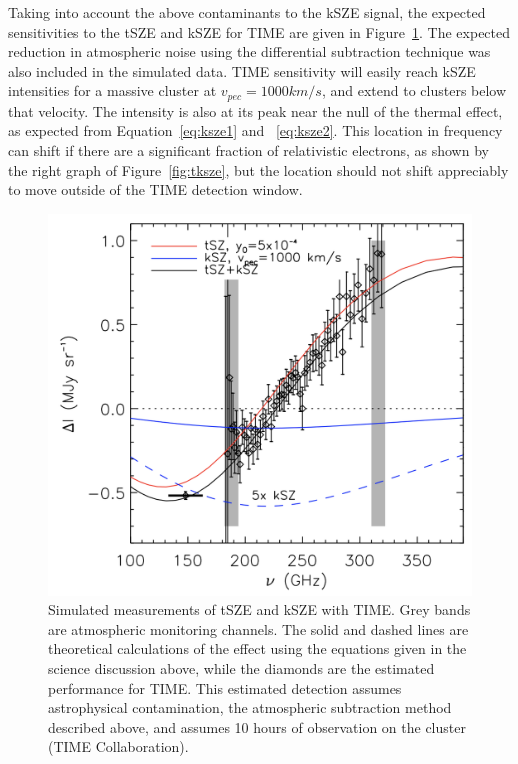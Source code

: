 \documentclass[manuscript]{aastex}
\begin{document}
Taking into account the above contaminants to the kSZE signal, the expected sensitivities to the tSZE and kSZE for TIME are given in Figure~\ref{fig:time1}. The expected reduction in atmospheric noise using the differential subtraction technique was also included in the simulated data. TIME sensitivity will easily reach kSZE intensities for a massive cluster at $v_{pec} = 1000 km/s$, and extend to clusters below that velocity. The intensity is also at its peak near the null of the thermal effect, as expected from Equation~\ref{eq:ksze1} and ~\ref{eq:ksze2}. This location in frequency can shift if there are a significant fraction of relativistic electrons, as shown by the right graph of Figure~\ref{fig:tksze}, but the location should not shift appreciably to move outside of the TIME detection window.
\begin{figure}[H]
\centering
\captionsetup{width=\textwidth}
\includegraphics[width=\textwidth]{time1.png}
\caption[Expected TIME kSZE \& tSZE Measurements -(TIME Collaboration)]{Simulated measurements of tSZE and kSZE with TIME. Grey bands are atmospheric monitoring channels. The solid and dashed lines are theoretical calculations of the effect using the equations given in the science discussion above, while the diamonds are the estimated performance for TIME. This estimated detection assumes astrophysical contamination, the atmospheric subtraction method described above, and assumes 10 hours of observation on the cluster (TIME Collaboration).}
\label{fig:time1}
\end{figure}
\end{document}
